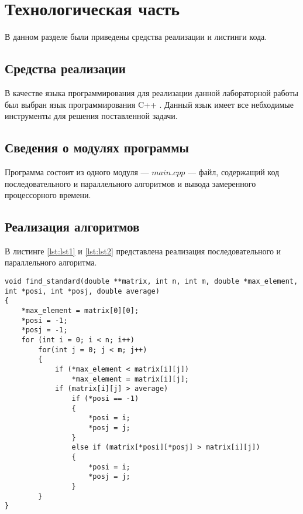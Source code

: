 \chapter{Технологическая часть}

В данном разделе были приведены средства реализации и листинги кода.

\section{Средства реализации}

В качестве языка программирования для реализации данной лабораторной работы был выбран язык программирования C++ \cite{Cpp}. Данный язык имеет все небходимые инструменты для решения поставленной задачи.

\section{Сведения о модулях программы}
Программа состоит из одного модуля --- $main.cpp$ — файл, содержащий код последовательного и параллельного алгоритмов и вывода замеренного процессорного времени.


\section{Реализация алгоритмов}
В листинге \ref{lst:lst1} и \ref{lst:lst2} представлена реализация последовательного и параллельного алгоритма.

\begin{lstlisting}[label=lst:lst1,caption=Последовательный алгоритм]
void find_standard(double **matrix, int n, int m, double *max_element, int *posi, int *posj, double average)
{
    *max_element = matrix[0][0];
    *posi = -1;
    *posj = -1;
    for (int i = 0; i < n; i++)
        for(int j = 0; j < m; j++)
        {
            if (*max_element < matrix[i][j])
                *max_element = matrix[i][j];
            if (matrix[i][j] > average)
                if (*posi == -1)
                {
                    *posi = i;
                    *posj = j;
                }
                else if (matrix[*posi][*posj] > matrix[i][j])
                {
                    *posi = i;
                    *posj = j;
                }
        }
}
\end{lstlisting}

